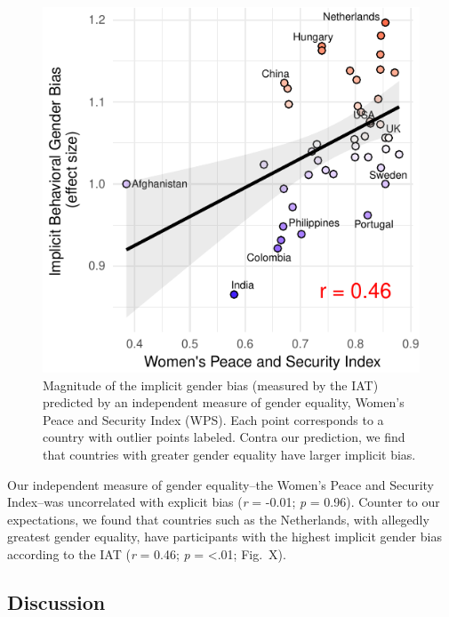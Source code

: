 \documentclass[10pt, letterpaper]{article}
\newenvironment{CodeChunk}{}{}
\begin{document}
\begin{CodeChunk}
\begin{figure}[t]

{\centering \includegraphics{figs/WPS_plot-1} 

}

\caption[Magnitude of the implicit gender bias (measured by the IAT) predicted by an independent measure of gender equality, Women's Peace and Security Index (WPS)]{Magnitude of the implicit gender bias (measured by the IAT) predicted by an independent measure of gender equality, Women's Peace and Security Index (WPS).  Each point corresponds to a country with outlier points labeled. Contra our prediction, we find that countries with greater gender equality have larger implicit bias.}\label{fig:WPS_plot}
\end{figure}
\end{CodeChunk}

Our independent measure of gender equality--the Women's Peace and
Security Index--was uncorrelated with explicit bias (\emph{r} = -0.01;
\emph{p} = 0.96). Counter to our expectations, we found that countries
such as the Netherlands, with allegedly greatest gender equality, have
participants with the highest implicit gender bias according to the IAT
(\emph{r} = 0.46; \emph{p} = \textless{}.01; Fig.~X).

\subsection{Discussion}\label{discussion}
\end{document}
